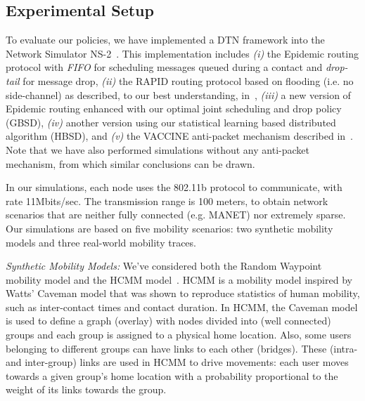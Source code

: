 \subsection{Experimental Setup}
\label{sec:ExperimentalSetup}

To evaluate our policies, we have implemented a DTN framework into the Network Simulator NS-2~\cite{DTN-NS2}. This implementation includes \emph{(i)} the Epidemic routing protocol with \emph{FIFO} for scheduling messages queued during a contact and \emph{drop-tail} for message drop, \emph{(ii)} the RAPID routing protocol based on flooding (i.e. no side-channel) as described, to our best
understanding, in~\cite{Levine:Sigcomm07}, \emph{(iii)} a new version of Epidemic routing enhanced with our optimal joint scheduling and drop policy (GBSD), \emph{(iv)} another version using our statistical learning based distributed algorithm (HBSD), and \emph{(v)} the VACCINE anti-packet mechanism described in~\cite{Towsley:Epidemic}. Note that we have also performed simulations without any anti-packet mechanism, from which similar conclusions can be drawn.

In our simulations, each node uses the 802.11b protocol to communicate, with rate 11Mbits/sec. The transmission range is 100 meters, to obtain network scenarios that are neither fully connected (e.g. MANET) nor extremely sparse. Our simulations are based on five mobility scenarios: two synthetic mobility models and three real-world mobility traces.

\emph{Synthetic Mobility Models:} We've considered both the Random Waypoint mobility model and the HCMM model~\cite{HCMM}. HCMM is a mobility model inspired by Watts' Caveman model that was shown to reproduce statistics of human mobility, such as inter-contact times and contact duration. In HCMM, the Caveman model is used to define a graph (overlay) with nodes divided into (well connected) groups and each group is assigned to a physical home location. Also, some users belonging to different groups can have links to each other (bridges). These (intra- and inter-group) links are used in HCMM to drive movements: each user moves towards a given group's home location with a probability proportional to the weight of its links towards the group.

